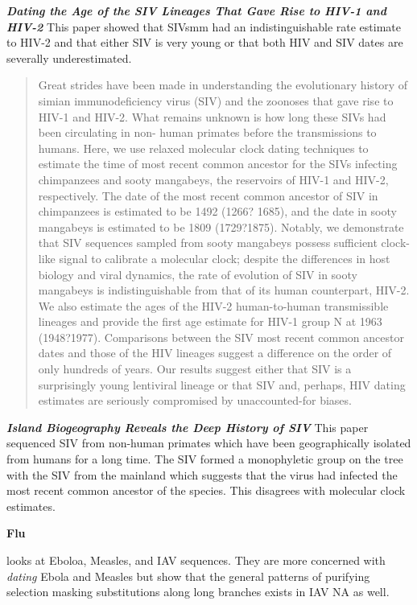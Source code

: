 \textbf{\textit{Dating the Age of the SIV Lineages That Gave Rise to HIV-1 and HIV-2}}\citep{wertheim2009dating}
This paper showed that SIVsmm had an indistinguishable rate estimate to HIV-2 and that either SIV is very young or that both HIV and SIV dates are severally underestimated. 
\begin{quote}
Great strides have been made in understanding the evolutionary history of simian immunodeficiency virus (SIV) and the zoonoses that gave rise to HIV-1 and HIV-2. What remains unknown is how long these SIVs had been circulating in non- human primates before the transmissions to humans. Here, we use relaxed molecular clock dating techniques to estimate the time of most recent common ancestor for the SIVs infecting chimpanzees and sooty mangabeys, the reservoirs of HIV-1 and HIV-2, respectively. The date of the most recent common ancestor of SIV in chimpanzees is estimated to be 1492 (1266? 1685), and the date in sooty mangabeys is estimated to be 1809 (1729?1875). Notably, we demonstrate that SIV sequences sampled from sooty mangabeys possess sufficient clock-like signal to calibrate a molecular clock; despite the differences in host biology and viral dynamics, the rate of evolution of SIV in sooty mangabeys is indistinguishable from that of its human counterpart, HIV-2. We also estimate the ages of the HIV-2 human-to-human transmissible lineages and provide the first age estimate for HIV-1 group N at 1963 (1948?1977). Comparisons between the SIV most recent common ancestor dates and those of the HIV lineages suggest a difference on the order of only hundreds of years. Our results suggest either that SIV is a surprisingly young lentiviral lineage or that SIV and, perhaps, HIV dating estimates are seriously compromised by unaccounted-for biases.
\end{quote}

\textbf{\textit{Island Biogeography Reveals the Deep History of SIV}}\citep{worobey2010island}
This paper sequenced SIV from non-human primates which have been geographically isolated from humans for a long time. 
The SIV formed a monophyletic group on the tree with the SIV from the mainland which suggests that the virus had infected the most recent common ancestor of the species. 
This disagrees with molecular clock estimates. 

\textbf{Flu}


\citep{wertheim2011purifying} looks at Eboloa, Measles, and IAV sequences. 
They are more concerned with \textit{dating} Ebola and Measles but show that the general patterns of purifying selection masking substitutions along long branches exists in IAV NA as well. 


